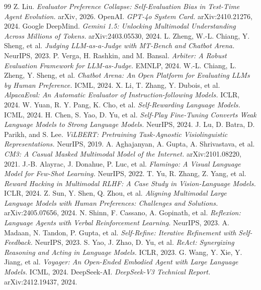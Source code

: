 \documentclass[11pt,a4paper]{article}
\begin{document}

\begin{thebibliography}{99}
 Z. Liu. \textit{Evaluator Preference Collapse: Self-Evaluation Bias in Test-Time Agent Evolution.} arXiv, 2026.
 OpenAI. \textit{GPT-4o System Card.} arXiv:2410.21276, 2024.
 Google DeepMind. \textit{Gemini 1.5: Unlocking Multimodal Understanding Across Millions of Tokens.} arXiv:2403.05530, 2024.
 L. Zheng, W.-L. Chiang, Y. Sheng, et al. \textit{Judging LLM-as-a-Judge with MT-Bench and Chatbot Arena.} NeurIPS, 2023.
 P. Verga, H. Rashkin, and M. Bansal. \textit{Arbiter: A Robust Evaluation Framework for LLM-as-Judge.} EMNLP, 2024.
 W.-L. Chiang, L. Zheng, Y. Sheng, et al. \textit{Chatbot Arena: An Open Platform for Evaluating LLMs by Human Preference.} ICML, 2024.
 X. Li, T. Zhang, Y. Dubois, et al. \textit{AlpacaEval: An Automatic Evaluator of Instruction-following Models.} ICLR, 2024.
 W. Yuan, R. Y. Pang, K. Cho, et al. \textit{Self-Rewarding Language Models.} ICML, 2024.
 H. Chen, S. Yao, D. Yu, et al. \textit{Self-Play Fine-Tuning Converts Weak Language Models to Strong Language Models.} NeurIPS, 2024.
 J. Lu, D. Batra, D. Parikh, and S. Lee. \textit{ViLBERT: Pretraining Task-Agnostic Visiolinguistic Representations.} NeurIPS, 2019.
 A. Aghajanyan, A. Gupta, A. Shrivastava, et al. \textit{CM3: A Casual Masked Multimodal Model of the Internet.} arXiv:2101.08220, 2021.
 J.-B. Alayrac, J. Donahue, P. Luc, et al. \textit{Flamingo: A Visual Language Model for Few-Shot Learning.} NeurIPS, 2022.
 T. Yu, R. Zhang, Z. Yang, et al. \textit{Reward Hacking in Multimodal RLHF: A Case Study in Vision-Language Models.} ICLR, 2024.
 Z. Sun, Y. Shen, Q. Zhou, et al. \textit{Aligning Multimodal Large Language Models with Human Preferences: Challenges and Solutions.} arXiv:2405.07656, 2024.
 N. Shinn, F. Cassano, A. Gopinath, et al. \textit{Reflexion: Language Agents with Verbal Reinforcement Learning.} NeurIPS, 2023.
 A. Madaan, N. Tandon, P. Gupta, et al. \textit{Self-Refine: Iterative Refinement with Self-Feedback.} NeurIPS, 2023.
 S. Yao, J. Zhao, D. Yu, et al. \textit{ReAct: Synergizing Reasoning and Acting in Language Models.} ICLR, 2023.
 G. Wang, Y. Xie, Y. Jiang, et al. \textit{Voyager: An Open-Ended Embodied Agent with Large Language Models.} ICML, 2024.
 DeepSeek-AI. \textit{DeepSeek-V3 Technical Report.} arXiv:2412.19437, 2024.
\end{thebibliography}
\end{document}
